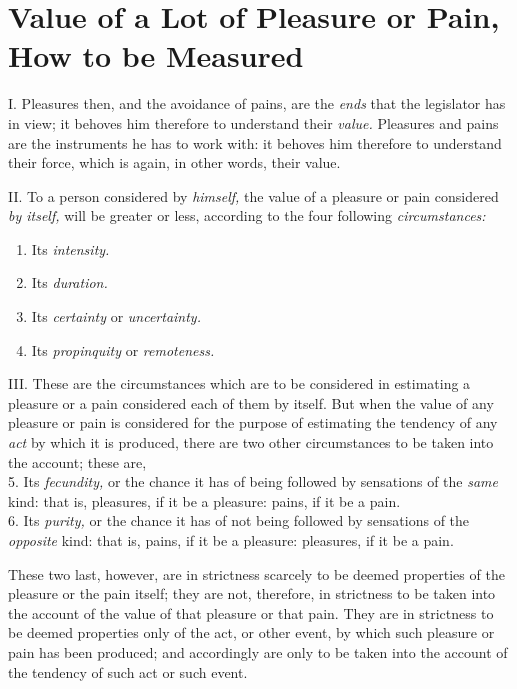 \documentclass[12pt]{report}
\begin{document}
\chapter{Value of a Lot of Pleasure or Pain, How to be
Measured}

I. Pleasures then, and the avoidance of pains, are the \emph{ends} that
the legislator has in view; it behoves him therefore to understand their
\emph{value.} Pleasures and pains are the instruments he has to work
with: it behoves him therefore to understand their force, which is
again, in other words, their value.

II. To a person considered by \emph{himself,} the value of a pleasure or
pain considered \emph{by itself,} will be greater or less, according to
the four following \emph{circumstances:}
\begin{enumerate}
	\item Its \emph{intensity.} 
	\item Its \emph{duration.} 
	\item Its \emph{certainty} or \emph{uncertainty.}
	\item Its \emph{propinquity} or \emph{remoteness.} 
\end{enumerate}
III. These are the circumstances which are to be considered in
estimating a pleasure or a pain considered each of them by itself. But
when the value of any pleasure or pain is considered for the purpose of
estimating the tendency of any \emph{act} by which it is produced, there
are two other circumstances to be taken into the account; these are,\\
5. Its \emph{fecundity,} or the chance it has of being followed by
sensations of the \emph{same} kind: that is, pleasures, if it be a
pleasure: pains, if it be a pain.\\
6. Its \emph{purity,} or the chance it has of not being followed by
sensations of the \emph{opposite} kind: that is, pains, if it be a
pleasure: pleasures, if it be a pain.

These two last, however, are in strictness scarcely to be deemed
properties of the pleasure or the pain itself; they are not, therefore,
in strictness to be taken into the account of the value of that pleasure
or that pain. They are in strictness to be deemed properties only of the
act, or other event, by which such pleasure or pain has been produced;
and accordingly are only to be taken into the account of the tendency of
such act or such event.
\end{document}
